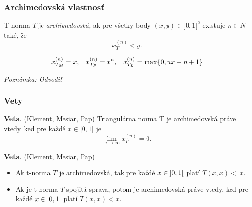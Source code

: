\documentclass{beamer}
\begin{document}
\begin{frame}
\frametitle{Archimedovská vlastnosť}
\begin{definition}
T-norma $T$ je {\em archimedovská,} ak pre všetky body $(x,y) \in ]0,1[^2$ existuje $n \in N$ také, že
$$ x_T^{(n)} < y.$$
\end{definition}
$$x_{T_M}^{(n)}=x, \hskip 3mm x_{T_P}^{(n)}= x^n, \hskip 3mm
x_{T_L}^{(n)}=
\max\{0, nx-n+1\}$$
\begin{small}
\textit{Poznámka: Odvodiť}\end{small}
\end{frame}

\begin{frame}
\frametitle{Vety}
{\bf Veta.}  (Klement, Mesiar, Pap)
Triangulárna norma T je archimedovská práve vtedy, ked pre každé $x \in ]0,1[$
je $$ \lim \limits_{n \rightarrow \infty} {x^{(n)}_T} = 0.$$

{\bf Veta.}  (Klement, Mesiar, Pap)
\begin{itemize}
\item Ak t-norma $T$ je archimedovská, tak pre každé $x
\in \hskip 1mm ]0,1[$ \hskip 1mm platí \hskip 1mm $ T(x,x) <~x$.
\item  Ak je t-norma $T$ spojitá sprava, potom je
archimedovská práve vtedy, keď pre každé $ x \in \hskip 1mm ]0,1[$ \hskip 1mm platí \hskip 1mm $
T(x,x) < x$.
\end{itemize}
\end{frame}
\end{document}
